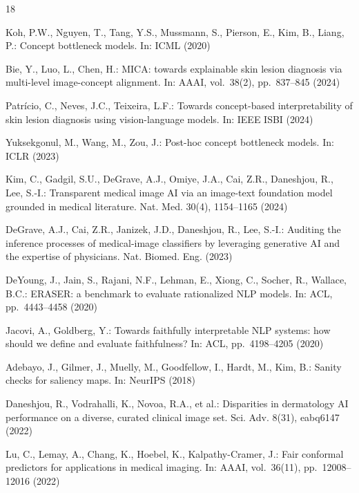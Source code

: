 \documentclass{svproc}
\begin{document}
%
%
\begin{thebibliography}{18}

Koh, P.W., Nguyen, T., Tang, Y.S., Mussmann, S., Pierson, E., Kim, B., Liang, P.:
Concept bottleneck models. In: ICML (2020)

Bie, Y., Luo, L., Chen, H.: MICA: towards explainable skin lesion diagnosis via
multi-level image-concept alignment. In: AAAI, vol.~38(2), pp.~837--845 (2024)

Patr\'icio, C., Neves, J.C., Teixeira, L.F.: Towards concept-based interpretability of
skin lesion diagnosis using vision-language models. In: IEEE ISBI (2024)

Yuksekgonul, M., Wang, M., Zou, J.: Post-hoc concept bottleneck models. In: ICLR (2023)

Kim, C., Gadgil, S.U., DeGrave, A.J., Omiye, J.A., Cai, Z.R., Daneshjou, R., Lee, S.-I.:
Transparent medical image AI via an image-text foundation model grounded in medical
literature. Nat. Med. 30(4), 1154--1165 (2024)

DeGrave, A.J., Cai, Z.R., Janizek, J.D., Daneshjou, R., Lee, S.-I.: Auditing the
inference processes of medical-image classifiers by leveraging generative AI and the
expertise of physicians. Nat. Biomed. Eng. (2023)

DeYoung, J., Jain, S., Rajani, N.F., Lehman, E., Xiong, C., Socher, R., Wallace, B.C.:
ERASER: a benchmark to evaluate rationalized NLP models. In: ACL, pp.~4443--4458 (2020)

Jacovi, A., Goldberg, Y.: Towards faithfully interpretable NLP systems: how should we
define and evaluate faithfulness? In: ACL, pp.~4198--4205 (2020)

Adebayo, J., Gilmer, J., Muelly, M., Goodfellow, I., Hardt, M., Kim, B.: Sanity checks
for saliency maps. In: NeurIPS (2018)

Daneshjou, R., Vodrahalli, K., Novoa, R.A., et al.: Disparities in dermatology AI
performance on a diverse, curated clinical image set. Sci. Adv. 8(31), eabq6147 (2022)

Lu, C., Lemay, A., Chang, K., Hoebel, K., Kalpathy-Cramer, J.: Fair conformal predictors
for applications in medical imaging. In: AAAI, vol.~36(11), pp.~12008--12016 (2022)


\end{thebibliography}
\end{document}
